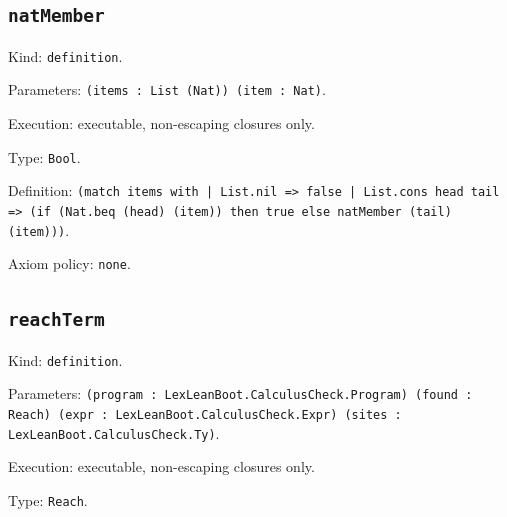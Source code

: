 \documentclass[11pt]{article}
\begin{document}
\subsection*{\texttt{natMember}}
\noindent Kind: \texttt{definition}.\par
\noindent Parameters: \texttt{(items : List (Nat)) (item : Nat)}.\par
\noindent Execution: executable, non-escaping closures only.\par
\noindent Type: \texttt{Bool}.\par
\noindent Definition: \texttt{(match items with | List.nil => false | List.cons head tail => (if (Nat.beq (head) (item)) then true else natMember (tail) (item)))}.\par
\noindent Axiom policy: \texttt{none}.\par
\subsection*{\texttt{reachTerm}}
\noindent Kind: \texttt{definition}.\par
\noindent Parameters: \texttt{(program : LexLeanBoot.CalculusCheck.Program) (found : Reach) (expr : LexLeanBoot.CalculusCheck.Expr) (sites : LexLeanBoot.CalculusCheck.Ty)}.\par
\noindent Execution: executable, non-escaping closures only.\par
\noindent Type: \texttt{Reach}.\par
\end{document}

